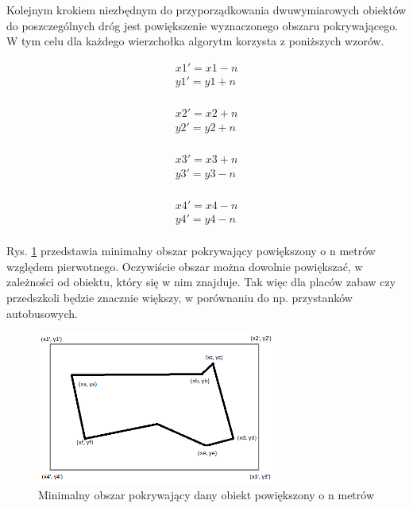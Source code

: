 Kolejnym krokiem niezbędnym do przyporządkowania dwuwymiarowych obiektów do poszczególnych dróg jest powiększenie wyznaczonego obszaru pokrywającego. W tym celu dla każdego wierzchołka algorytm korzysta z poniższych wzorów.

\begin{equation}
\begin{split}
x1' = x1 - n \\
y1' = y1 + n \\
\end{split}
\end{equation}

\begin{equation}
\begin{split}
x2' = x2 + n \\
y2' = y2 + n \\
\end{split}
\end{equation}

\begin{equation}
\begin{split}
x3' = x3 + n \\
y3' = y3 - n \\
\end{split}
\end{equation}

\begin{equation}
\begin{split}
x4' = x4 - n \\
y4' = y4 - n \\
\end{split}
\end{equation}

Rys. \ref{sec:thirdBB} przedstawia minimalny obszar pokrywający powiększony o n metrów względem pierwotnego. Oczywiście obszar można dowolnie powiększać, w zależności od obiektu, który się w nim znajduje. Tak więc dla placów zabaw czy przedszkoli będzie znacznie większy, w porównaniu do np. przystanków autobusowych.

\begin{figure}[h]
\caption{Minimalny obszar pokrywający dany obiekt powiększony o n metrów}
\label{sec:thirdBB}
\centering
\includegraphics[width=0.7\textwidth]{BoundingBoxExtended}
\end{figure}

